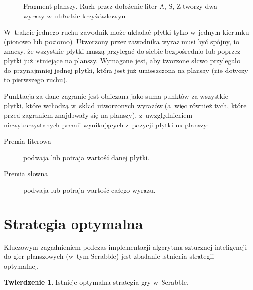 \documentclass[a4paper,twocolumn,12pt]{article}
\theoremstyle{definition}
\newtheorem{theorem}{Twierdzenie}
\begin{document}
\begin{figure}[ht!]
\begin{center}
		\caption{Fragment planszy. Ruch przez dołożenie liter A, S, Z tworzy dwa wyrazy w~układzie krzyżówkowym.}
		\label{fig:crossword_second}
	\end{center}
\end{figure}

W~trakcie jednego ruchu zawodnik może układać płytki tylko w~jednym kierunku (pionowo lub poziomo). Utworzony przez zawodnika wyraz musi być spójny, to znaczy, że wszystkie płytki muszą przylegać do siebie bezpośrednio lub poprzez płytki już istniejące na planszy. Wymagane jest, aby tworzone słowo przylegało do przynajmniej jednej płytki, która jest już umieszczona na planszy (nie dotyczy to pierwszego ruchu).

Punktacja za dane zagranie jest obliczana jako suma punktów za wszystkie płytki, które wchodzą w~skład utworzonych wyrazów (a~więc również tych, które przed zagraniem znajdowały się na planszy), z~uwzględnieniem niewykorzystanych premii wynikających z~pozycji płytki na planszy:

\begin{description}
 \item [Premia literowa] podwaja lub potraja wartość danej płytki.
 \item [Premia słowna] podwaja lub potraja wartość całego wyrazu.
\end{description}

\section*{Strategia optymalna}

Kluczowym zagadnieniem podczas implementacji algorytmu sztucznej inteligencji do gier planszowych (w~tym Scrabble) jest zbadanie istnienia strategii optymalnej.

\begin{theorem}
	Istnieje optymalna strategia gry w~Scrabble.
	\label{thm:optimal_strategy_existence}
\end{theorem}
\end{document}
